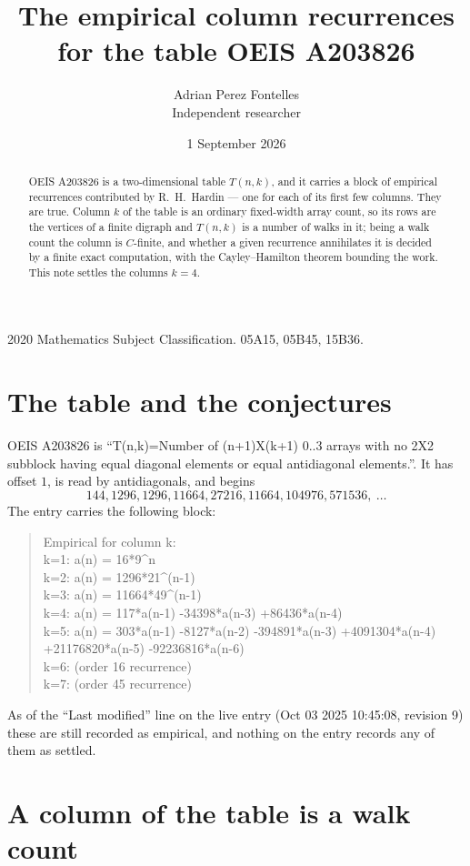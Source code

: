 \documentclass[11pt,a4paper]{article}
\title{The empirical column recurrences for the table OEIS A203826}
\author{Adrian Perez Fontelles\\ \small Independent researcher}
\date{1 September 2026}
\theoremstyle{plain}
\theoremstyle{definition}
\begin{document}
\maketitle

\begin{abstract}
OEIS A203826 is a two-dimensional table $T(n,k)$, and it carries a block of empirical
recurrences contributed by R.~H.~Hardin --- one for each of its first few columns. They are
true. Column $k$ of the table is an ordinary fixed-width array count, so its rows are the
vertices of a finite digraph and $T(n,k)$ is a number of walks in it; being a walk count the
column is $C$-finite, and whether a given recurrence annihilates it is decided by a finite
exact computation, with the Cayley--Hamilton theorem bounding the work. This note settles the
columns $k=4$.
\end{abstract}

\noindent\small 2020 Mathematics Subject Classification. 05A15, 05B45, 15B36.\normalsize

\section{The table and the conjectures}

OEIS A203826 is ``T(n,k)=Number of (n+1)X(k+1) 0..3 arrays with no 2X2 subblock having equal diagonal elements or equal antidiagonal elements.''. It has offset $1$, is
read by antidiagonals, and begins
\[
144, 1296, 1296, 11664, 27216, 11664, 104976, 571536,\ \dots
\]
The entry carries the following block:
\begin{quote}\small
Empirical for column k:\\
k=1: a(n) = 16*9\^{}n\\
k=2: a(n) = 1296*21\^{}(n-1)\\
k=3: a(n) = 11664*49\^{}(n-1)\\
k=4: a(n) = 117*a(n-1) -34398*a(n-3) +86436*a(n-4)\\
k=5: a(n) = 303*a(n-1) -8127*a(n-2) -394891*a(n-3) +4091304*a(n-4) +21176820*a(n-5) -92236816*a(n-6)\\
k=6: (order 16 recurrence)\\
k=7: (order 45 recurrence)\\
\end{quote}
As of the ``Last modified'' line on the live entry (Oct 03 2025 10:45:08, revision 9) these are still
recorded as empirical, and nothing on the entry records any of them as settled.

\section{A column of the table is a walk count}
\end{document}
